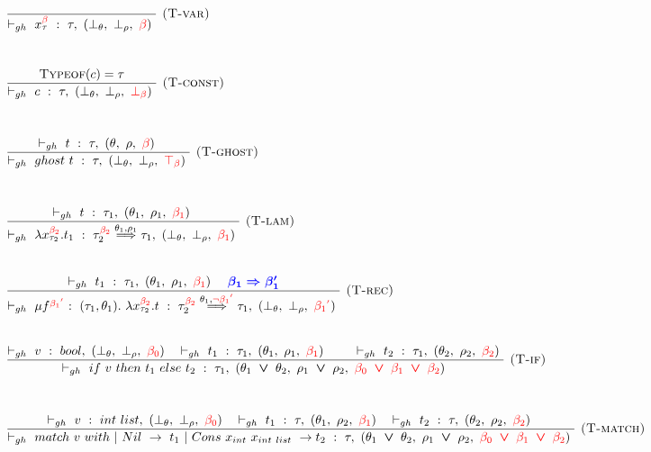 \documentclass[a4paper,11pt,oneside]{article}
\theoremstyle{plain}
\newcommand{\rouge}[1]{\textcolor{red}{#1}}
\newcommand{\bvee}{\boldsymbol{~\vee~}}
\newcommand{\ghosttyping}[6]{\vdash_{gh}~#1~:~#2,~(#3,~#4,~\rouge{#5})~\textcolor{blue}{\boldsymbol{#6}}}
\newcommand{\bth}{\bot_\theta}
\newcommand{\brh}{\bot_\rho}
\newcommand{\gb}{\beta}
\newcommand{\gba}[1]{\beta_{#1}}
\newcommand{\gbb}{\bot_\beta}
\newcommand{\gbt}{\top_\beta}
\newcommand{\gbr}{\textcolor{red}{\gb}}
\newcommand{\gbra}[1]{\textcolor{red}{\gba{#1}}}
\newcommand{\gbbr}{\textcolor{red}{\gbb}}
\newcommand{\gbtr}{\textcolor{red}{\gbt}}
\newcommand{\gbran}[1]{\textcolor{red}{\neg\gba{#1}}}
\begin{document}
\begin{figure}[H]
\begin{adjustwidth}{-5em}{5em}
\begin{small}
\begin{minipage}[t]{0.45\linewidth}
\begin{displaymath}
\begin{array}{l}

\dfrac
	{}
	{\ghosttyping{x^{\gbr}_{\tau}}{\tau}{\bot_{\theta}}{\bot_{\rho}}{\gbr}{}}
	{\textsc{  (T-var)}} \\[1.3cm]	

\dfrac
	{\textsc{Typeof}(c) = \tau}
	{\ghosttyping{c}{\tau}{\bot_{\theta}}{\bot_{\rho}}{\gbbr}{}}
	{\textsc{  (T-const)}} \\[1.3cm]	


\dfrac
	{\ghosttyping
		{t}
		{\tau}
		{\theta}
		{\rho}
		{\gbr}
		{}}
	{\ghosttyping
		{ghost~t}
		{\tau}
		{\bth}
		{\brh}
		{\gbtr}
		{}} 
{\textsc{  (T-ghost)}}	\\[1.3cm]		
	
\dfrac
	{\ghosttyping
		{t}
		{\tau_1}
		{\theta_1}
		{\rho_1}
		{\gbra{1}}
		{}}
	{\ghosttyping
		{\lambda x^{\gbra{2}}_{\tau_2} . t_1}
		{\tau_{2}^{\gbra{2}} \stackrel{\theta_1, \rho_1}{\Longrightarrow} \tau_1}
		{\bth}
		{\brh}
		{\gbra{1}}
		{}}
	{\textsc{  (T-lam)}}\\[1.3cm]			
	
\dfrac
	{\ghosttyping
		{t_1}
		{\tau_1}
		{\theta_1}
		{\rho_1}
		{\gbra{1}}
		{\quad \gba{1} \Rightarrow \beta_1'}}
	{\ghosttyping
		{\mu f^{\gbra{1}^{\rouge{'}}}:~(\tau_1, \theta_1).~\lambda x^{\gbra{2}}_{\tau_2}. t} 
		{\tau_{2}^{\gbra{2}} \stackrel{\theta_1, \gbran{1}^{\rouge{'}}}{\Longrightarrow} \tau_1}
		{\bth}
		{\brh}
		{\gbra{1}^{\rouge{'}}}
		{}}
	{\textsc{  (T-rec)}}\\[1.3cm]			
	
	\dfrac
	{
		\ghosttyping{v}{bool}{\bth}{\brh}{\gbra{0}}{} ~~
		\ghosttyping{t_1}{\tau_1}{\theta_1}{\rho_1}{\gbra{1}}{} \qquad
		\ghosttyping{t_2}{\tau_1}{\theta_2}{\rho_2}{\gbra{2}}{}
	}
	{	\ghosttyping{if~v~then~t_1~else~t_2}
		{\tau_1}{\theta_1 \bvee \theta_2}{\rho_1 \bvee \rho_2}
		{\gbra{0} \bvee \gbra{1} \bvee \gbra{2}}{}}
	{\textsc{  (T-if)}}	\\[1.3cm]	
		
\dfrac
	{\ghosttyping{v}{int~list}{\bth}{\brh}{\gbra{0}}{} ~~
	 \ghosttyping{t_1}{\tau}{\theta_1}{\rho_2}{\gbra{1}}{}  ~~
	 \ghosttyping{t_2}{\tau}{\theta_2}{\rho_2}{\gbra{2}}{}  }
	{\ghosttyping{match~v~with ~|~Nil~->~t_1~|~Cons~x_{int}~x_{int~list}~->t_2}{\tau}{\theta_1 \bvee \theta_2}
		{\rho_1 \bvee \rho_2}
		{\gbra{0} \bvee \gbra{1} \bvee \gbra{2}}{}} 
{\textsc{  (T-match)}}
	

\end{array}
\end{displaymath}
\end{minipage}
\end{small}
\end{adjustwidth}
\end{figure}
\end{document}
